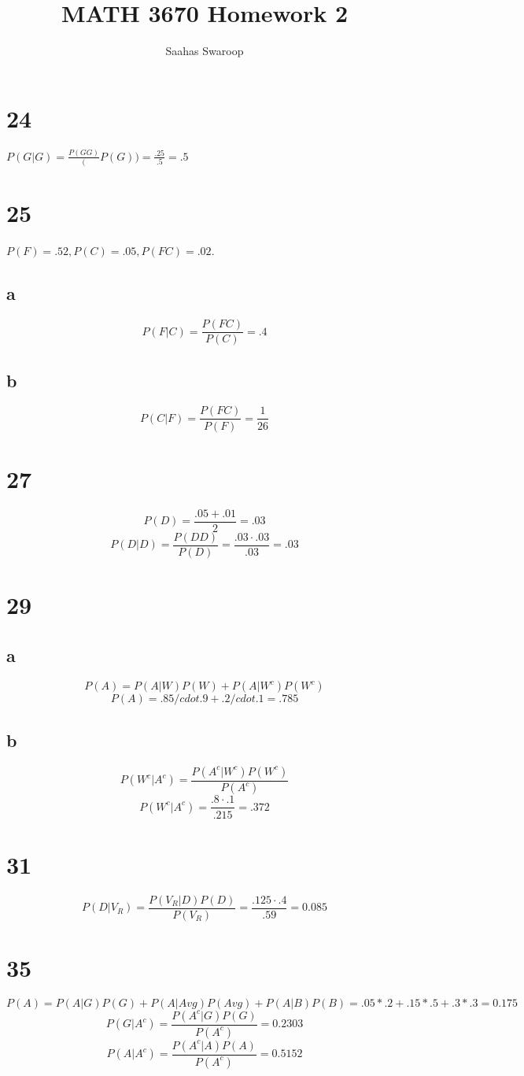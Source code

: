 \documentclass[12pt]{article}
\title{\textbf{MATH 3670 Homework 2}}
\author{Saahas Swaroop}
\begin{document}
  \maketitle
  \pagebreak

  \section*{24}
  $P(G | G) = \frac{P(GG)}(P(G)) = \frac{.25}{.5} = .5$
  \section*{25}
  $P(F) = .52, P(C) = .05, P(FC) = .02$. 
  \subsection*{a}
  $$P(F | C) = \frac{P(FC)}{P(C)} = .4$$
  \subsection*{b}
  $$P(C | F) = \frac{P(FC)}{P(F)} = \frac{1}{26}$$ 
  \section*{27}
  $$ P(D) = \frac{.05 + .01}{2} = .03 $$
  $$ P( D | D ) = \frac{P(DD)}{P(D)} = \frac{.03 \cdot .03}{.03} = .03$$ 


  \section*{29}
  \subsection*{a}
  $$ P(A) = P(A | W)P(W) + P(A | W^c)P(W^c) $$
  $$ P(A) = .85 /cdot .9 + .2 /cdot .1 = .785 $$
  \subsection*{b}
  $$ P(W^c | A^c) = \frac{P(A^c | W^c)P(W^c)}{P(A^c)} $$
  $$ P(W^c | A^c) = \frac{.8 \cdot .1}{.215} = .372 $$
  \section*{31}
  $$ P(D | V_R) = \frac{P(V_R | D)P(D)}{P(V_R)} = \frac{.125 \cdot .4}{.59} = 0.085 $$
  \section*{35}
  $$ P(A) = P(A | G)P(G) + P(A | Avg)P(Avg) + P(A | B)P(B)  = .05 * .2 + .15 * .5 + .3 * .3 = 0.175$$
  $$ P( G | A^c) = \frac{P(A^c | G)P(G)}{P(A^c)} = 0.2303 $$
  $$ P( A | A^c) = \frac{P(A^c | A)P(A)}{P(A^c)} = 0.5152 $$
\end{document}
